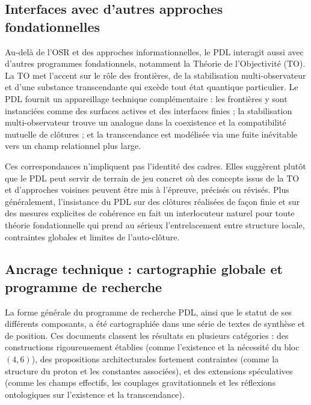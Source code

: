 \documentclass[11pt,a4paper]{article}
\theoremstyle{definition}
\begin{document}
\subsection{Interfaces avec d'autres approches fondationnelles}

Au-delà de l’OSR et des approches informationnelles, le PDL interagit aussi avec d’autres programmes fondationnels, notamment la Théorie de l’Objectivité (TO).\cite{Laubscher_PDL_TO_Dialogue_2024,Laubscher_PDL_Position_2024} La TO met l’accent sur le rôle des frontières, de la stabilisation multi-observateur et d’une substance transcendante qui excède tout état quantique particulier. Le PDL fournit un appareillage technique complémentaire : les frontières y sont instanciées comme des surfaces actives et des interfaces finies ; la stabilisation multi-observateur trouve un analogue dans la coexistence et la compatibilité mutuelle de clôtures ; et la transcendance est modélisée via une fuite inévitable vers un champ relationnel plus large.\cite{Laubscher_Leakage_Probability_2024,Laubscher_UniversalCoherenceLeakage_2024}

Ces correspondances n’impliquent pas l’identité des cadres. Elles suggèrent plutôt que le PDL peut servir de terrain de jeu concret où des concepts issus de la TO et d’approches voisines peuvent être mis à l’épreuve, précisés ou révisés.\cite{Laubscher_PDL_TO_Dialogue_2024} Plus généralement, l’insistance du PDL sur des clôtures réalisées de façon finie et sur des mesures explicites de cohérence en fait un interlocuteur naturel pour toute théorie fondationnelle qui prend au sérieux l’entrelacement entre structure locale, contraintes globales et limites de l’auto-clôture.

\subsection{Ancrage technique : cartographie globale et programme de recherche}

La forme générale du programme de recherche PDL, ainsi que le statut de ses différents composants, a été cartographiée dans une série de textes de synthèse et de position.\cite{Laubscher_PDL_Position_2024,Laubscher_PDL_GlobalMapping_v6_2024} Ces documents classent les résultats en plusieurs catégories : des constructions rigoureusement établies (comme l’existence et la nécessité du bloc \((4,6)\)), des propositions architecturales fortement contraintes (comme la structure du proton et les constantes associées), et des extensions spéculatives (comme les champs effectifs, les couplages gravitationnels et les réflexions ontologiques sur l’existence et la transcendance).\cite{Laubscher_MinimalClosures_46_2024,Laubscher_ProtonArch_v2_2024,Laubscher_Alpha_v2_2024,Laubscher_UniversalCoherenceLeakage_2024,Laubscher_Existence_PulsatingClosure_2026}
\end{document}
